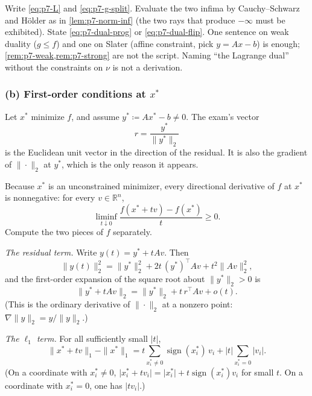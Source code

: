 \begin{examnote}
\label{examnote:p7-dual}
Write \eqref{eq:p7-L} and \eqref{eq:p7-g-split}. Evaluate the two infima by Cauchy--Schwarz and H\"older as in \cref{lem:p7-norm-inf} (the two rays that produce \(-\infty\) must be exhibited). State \eqref{eq:p7-dual-prog} or \eqref{eq:p7-dual-flip}. One sentence on weak duality (\(g\le f\)) and one on Slater (affine constraint, pick \(y=Ax-b\)) is enough; \cref{rem:p7-weak,rem:p7-strong} are not the script. Naming ``the Lagrange dual'' without the constraints on \(\nu\) is not a derivation.
\end{examnote}

\subsubsection{(b) First-order conditions at \(x^{*}\)}

Let \(x^{*}\) minimize \(f\), and assume \(y^{*}\coloneqq Ax^{*}-b\neq 0\). The exam's vector
\[
r
=
\frac{y^{*}}{\|y^{*}\|_{2}}
\]
is the Euclidean unit vector in the direction of the residual. It is also the gradient of \(\|\cdot\|_{2}\) at \(y^{*}\), which is the only reason it appears.

Because \(x^{*}\) is an unconstrained minimizer, every directional derivative of \(f\) at \(x^{*}\) is nonnegative: for every \(v\in\mathbb{R}^{n}\),
\begin{equation}
\label{eq:p7-dir}
\liminf_{t\downarrow 0}\frac{f(x^{*}+tv)-f(x^{*})}{t}
\ge 0.
\end{equation}
Compute the two pieces of \(f\) separately.

\emph{The residual term.} Write \(y(t)=y^{*}+tAv\). Then
\[
\|y(t)\|_{2}^{2}
=
\|y^{*}\|_{2}^{2}+2t\,(y^{*})^{\top}Av+t^{2}\|Av\|_{2}^{2},
\]
and the first-order expansion of the square root about \(\|y^{*}\|_{2}>0\) is
\begin{equation}
\label{eq:p7-res-diff}
\|y^{*}+tAv\|_{2}
=
\|y^{*}\|_{2}+t\,r^{\top}Av+o(t).
\end{equation}
(This is the ordinary derivative of \(\|\cdot\|_{2}\) at a nonzero point: \(\nabla\|y\|_{2}=y/\|y\|_{2}\).)

\emph{The \(\ell_1\) term.} For all sufficiently small \(\lvert t\rvert\),
\begin{equation}
\label{eq:p7-l1-diff}
\|x^{*}+tv\|_{1}-\|x^{*}\|_{1}
=
t\sum_{x_{i}^{*}\neq 0}\operatorname{sign}(x_{i}^{*})\,v_{i}
+
\lvert t\rvert\sum_{x_{i}^{*}=0}\lvert v_{i}\rvert.
\end{equation}
(On a coordinate with \(x_{i}^{*}\neq 0\), \(\lvert x_{i}^{*}+tv_{i}\rvert=\lvert x_{i}^{*}\rvert+t\operatorname{sign}(x_{i}^{*})v_{i}\) for small \(t\). On a coordinate with \(x_{i}^{*}=0\), one has \(\lvert tv_{i}\rvert\).)

